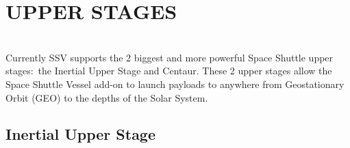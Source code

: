 \documentclass[Space_Shuttle_Vessel_Manual.tex]{subfiles}
\begin{document}
\section{UPPER STAGES}
\begin{multicols*}{2}
\label{sec:upper-stages}
\renewcommand{\cfttoctitlefont}{\bf}
\localtableofcontents
\noindent
\\
Currently SSV supports the 2 biggest and more powerful Space Shuttle upper stages$\colon$ the Inertial Upper Stage and Centaur. These 2 upper stages allow the Space Shuttle Vessel add-on to launch payloads to anywhere from Geostationary Orbit (GEO) to the depths of the Solar System.
\end{multicols*}


\subsection{Inertial Upper Stage}
\end{document}
